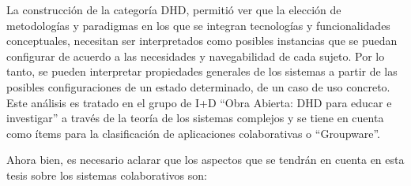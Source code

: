 La construcción de la categoría DHD, permitió ver que la elección de metodologías y paradigmas en los que se integran tecnologías y funcionalidades conceptuales, necesitan ser interpretados como posibles instancias que se puedan configurar de acuerdo a las necesidades y navegabilidad de cada sujeto. Por lo tanto, se pueden interpretar propiedades generales de los sistemas a partir de las posibles configuraciones de un estado determinado, de un caso de uso concreto. Este análisis es tratado en el grupo de I+D “Obra Abierta: DHD para educar e investigar'' a través de la teoría de los sistemas complejos y se tiene en cuenta como ítems para la clasificación de aplicaciones colaborativas o “Groupware''.

Ahora bien, es necesario aclarar que los aspectos que se tendrán en cuenta en esta tesis sobre los sistemas colaborativos son:


